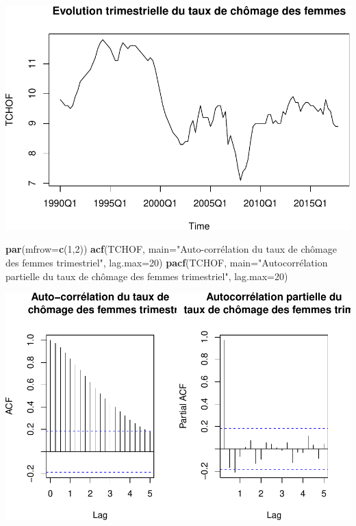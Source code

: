 \documentclass[11pt,]{article}
\newenvironment{Shaded}{\begin{snugshade}}{\end{snugshade}}
\newcommand{\KeywordTok}[1]{\textcolor[rgb]{0.13,0.29,0.53}{\textbf{{#1}}}}
\newcommand{\DataTypeTok}[1]{\textcolor[rgb]{0.13,0.29,0.53}{{#1}}}
\newcommand{\DecValTok}[1]{\textcolor[rgb]{0.00,0.00,0.81}{{#1}}}
\newcommand{\StringTok}[1]{\textcolor[rgb]{0.31,0.60,0.02}{{#1}}}
\newcommand{\NormalTok}[1]{{#1}}
\begin{document}
\includegraphics{doc_files/figure-latex/unnamed-chunk-5-1.pdf}

\begin{Shaded}
\begin{Highlighting}[]
  \KeywordTok{par}\NormalTok{(}\DataTypeTok{mfrow=}\KeywordTok{c}\NormalTok{(}\DecValTok{1}\NormalTok{,}\DecValTok{2}\NormalTok{))}
  \KeywordTok{acf}\NormalTok{(TCHOF, }\DataTypeTok{main=}\StringTok{"Auto-corrélation du taux de}
\StringTok{      chômage des femmes trimestriel"}\NormalTok{, }\DataTypeTok{lag.max=}\DecValTok{20}\NormalTok{)}
  \KeywordTok{pacf}\NormalTok{(TCHOF, }\DataTypeTok{main=}\StringTok{"Autocorrélation partielle du}
\StringTok{       taux de chômage des femmes trimestriel"}\NormalTok{, }\DataTypeTok{lag.max=}\DecValTok{20}\NormalTok{)}
\end{Highlighting}
\end{Shaded}

\includegraphics{doc_files/figure-latex/unnamed-chunk-5-2.pdf}
\end{document}
